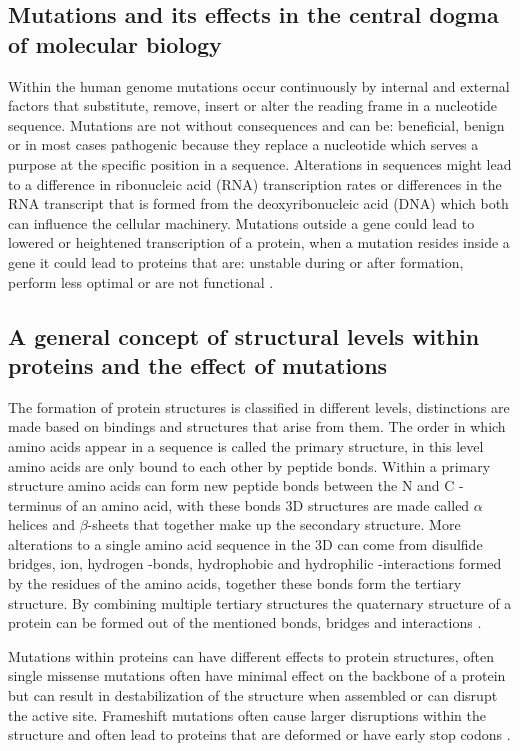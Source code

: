 \subsection{Mutations and its effects in the central dogma of molecular biology}
Within the human genome mutations occur continuously by internal and external factors that substitute, remove, insert or alter the reading frame in a nucleotide sequence. Mutations are not without consequences and can be: beneficial, benign or in most cases pathogenic because they replace a nucleotide which serves a purpose at the specific position in a sequence. Alterations in sequences might lead to a difference in ribonucleic acid (RNA) transcription rates or differences in the RNA transcript that is formed from the deoxyribonucleic acid (DNA) which both can influence the cellular machinery. Mutations outside a gene could lead to lowered or heightened transcription of a protein, when a mutation resides inside a gene it could lead to proteins that are: unstable during or after formation, perform less optimal or are not functional \cite{}.

\subsection{A general concept of structural levels within proteins and the effect of mutations}
The formation of protein structures is classified in different levels, distinctions are made based on bindings and structures that arise from them. 
The order in which amino acids appear in a sequence is called the primary structure, in this level amino acids are only bound to each other by peptide bonds. 
Within a primary structure amino acids can form new peptide bonds between the N and C -terminus of an amino acid, with these bonds 3D structures are made called $\alpha$ helices and $\beta$-sheets that together make up the secondary structure.
More alterations to a single amino acid sequence in the 3D can come from disulfide bridges, ion, hydrogen -bonds, hydrophobic and hydrophilic -interactions formed by the residues of the amino acids, together these bonds form the tertiary structure.
By combining multiple tertiary structures the quaternary structure of a protein can be formed out of the mentioned bonds, bridges and interactions \cite{}.


Mutations within proteins can have different effects to protein structures, often single missense mutations often have minimal effect on the backbone of a protein \cite{} but can result in destabilization of the structure when assembled or can disrupt the active site. Frameshift mutations often cause larger disruptions within the structure and often lead to proteins that are deformed or have early stop codons \cite{}.


